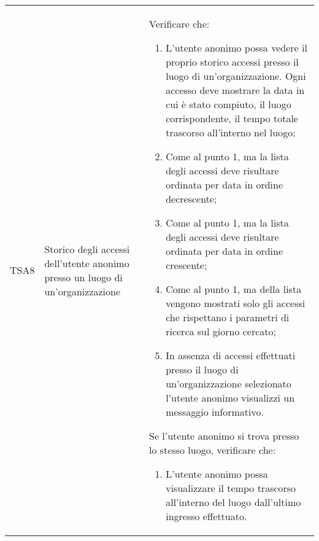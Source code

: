 {\begin{longtable}{ c  C{3cm}  C{11cm} }
TSA8 & Storico degli accessi dell'utente anonimo presso un luogo di un'organizzazione & 
Verificare che:    
\begin{enumerate}
    \item L'utente anonimo possa vedere il proprio storico accessi presso il luogo di un'organizzazione. Ogni accesso deve mostrare la data in cui è stato compiuto, il luogo corrispondente, il tempo totale trascorso all'interno nel luogo;
    \item Come al punto 1, ma la lista degli accessi deve risultare ordinata per data in ordine decrescente;
    \item Come al punto 1, ma la lista degli accessi deve risultare ordinata per data in ordine crescente;
    \item Come al punto 1, ma della lista vengono mostrati solo gli accessi che rispettano i parametri di ricerca sul giorno cercato;
    \item In assenza di accessi effettuati presso il luogo di un'organizzazione selezionato l'utente anonimo visualizzi un messaggio informativo.
\end{enumerate}
Se l'utente anonimo si trova presso lo stesso luogo, verificare che:
\begin{enumerate}
    \item L'utente anonimo possa visualizzare il tempo trascorso all'interno del luogo dall'ultimo ingresso effettuato.
\end{enumerate} \\


\end{longtable}}
